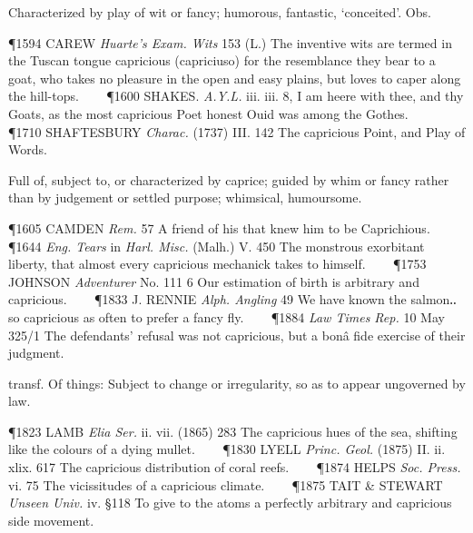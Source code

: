 \begin{description}[wide, labelwidth=!, labelindent=0pt]
\noindent {}

\noindent [ad. F. capricieux, ad. It. capriccioso (= Sp. caprichoso): see above. The by-form caprichious belongs to the corresp. forms of the n.]
\vspace{-0.3cm}

\begin{myenumerate}

 Characterized by play of wit or fancy; humorous, fantastic, ‘conceited’. Obs.

\P 1594 CAREW  \textit{Huarte's Exam. Wits} 153 (L.) The inventive wits are termed in the Tuscan tongue capricious (capriciuso) for the resemblance they bear to a goat, who takes no pleasure in the open and easy plains, but loves to caper along the hill-tops.    
\P 1600 SHAKES.  \textit{A.Y.L.} iii. iii. 8, I am heere with thee, and thy Goats, as the most capricious Poet honest Ouid was among the Gothes.    
\P 1710 SHAFTESBURY  \textit{Charac.} (1737) III. 142 The capricious Point, and Play of Words.

 Full of, subject to, or characterized by caprice; guided by whim or fancy rather than by judgement or settled purpose; whimsical, humoursome.

\P 1605 CAMDEN  \textit{Rem.} 57 A friend of his that knew him to be Caprichious.    
\P 1644 \textit{Eng. Tears} in \textit{Harl. Misc.} (Malh.) V. 450 The monstrous exorbitant liberty, that almost every capricious mechanick takes to himself.    
\P 1753 JOHNSON  \textit{Adventurer} No. 111 6 Our estimation of birth is arbitrary and capricious.    
\P 1833 J. RENNIE  \textit{Alph. Angling} 49 We have known the salmon‥so capricious as often to prefer a fancy fly.    
\P 1884 \textit{Law Times Rep.} 10 May 325/1 The defendants' refusal was not capricious, but a bonâ fide exercise of their judgment.

 transf. Of things: Subject to change or irregularity, so as to appear ungoverned by law.

\P 1823 LAMB  \textit{Elia Ser.} ii. vii. (1865) 283 The capricious hues of the sea, shifting like the colours of a dying mullet.    
\P 1830 LYELL  \textit{Princ. Geol.} (1875) II. ii. xlix. 617 The capricious distribution of coral reefs.    
\P 1874 HELPS  \textit{Soc. Press.} vi. 75 The vicissitudes of a capricious climate.    
\P 1875 TAIT  \& STEWART \textit{Unseen Univ.} iv. §118 To give to the atoms a perfectly arbitrary and capricious side movement.
\end{myenumerate}



\end{description}
